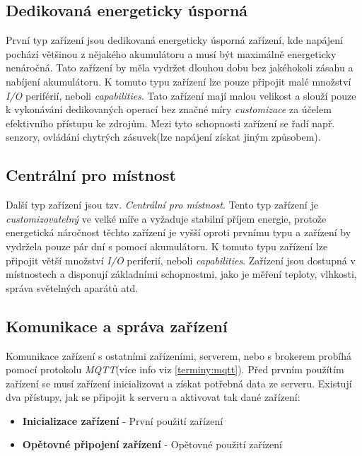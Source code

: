 \subsection*{Dedikovaná energeticky úsporná}
\label{hardware:usporna}
První typ zařízení jsou dedikovaná energeticky úsporná zařízení, kde napájení pochází většinou z nějakého akumulátoru a musí být maximálně energeticky nenáročná.
Tato zařízení by měla vydržet dlouhou dobu bez jakéhokoli zásahu a nabíjení akumulátoru.
K tomuto typu zařízení lze pouze připojit malé množství \emph{I/O} periférií, neboli \emph{capabilities}.
Tato zařízení mají malou velikost a slouží pouze k vykonávání dedikovaných operací bez značné míry \emph{customizace} za účelem efektivního přístupu ke zdrojům.
Mezi tyto schopnosti zařízení se řadí např. senzory, ovládání chytrých zásuvek(lze napájení získat jiným způsobem).

\subsection*{Centrální pro místnost}
\label{hardware:centralni}
Další typ zařízení jsou tzv. \emph{Centrální pro místnost}.
Tento typ zařízení je \emph{customizovatelný} ve velké míře a vyžaduje stabilní příjem energie, protože energetická náročnost těchto zařízení je vyšší oproti prvnímu typu a zařízení by vydržela pouze pár dní s pomocí akumulátoru.
K tomuto typu zařízení lze připojit větší množství \emph{I/O} periferií, neboli \emph{capabilities}.
Zařízení jsou dostupná v místnostech a disponují základními schopnostmi, jako je měření teploty, vlhkosti, správa světelných aparátů atd.

\newpage
\subsection*{Komunikace a správa zařízení}
\label{hardware:komunikace}

Komunikace zařízení s ostatními zařízeními, serverem, nebo s brokerem probíhá pomocí protokolu \emph{MQTT}(více info viz \ref{terminy:mqtt}).
Před prvním použítím zařízení se musí zařízení inicializovat a získat potřebná data ze serveru.
Existují dva přístupy, jak se připojit k serveru a aktivovat tak dané zařízení:
\begin{itemize}
  \item \textbf{Inicializace zařízení} - První použití zařízení
  \item \textbf{Opětovné připojení zařízení} - Opětovné použití zařízení
\end{itemize}

